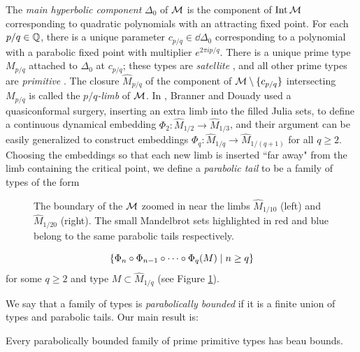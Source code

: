 \documentclass[12pt]{amsart}
\begin{document}
\renewcommand{\Card}{\dd \HC_0}
\newcommand{\HC}{\Delta}
{The \emph{main hyperbolic component} $\HC_0$ %
of $\mathcal M$ 
is the component of $\operatorname{Int} \mathcal M$
corresponding to quadratic polynomials with an attracting fixed point. 
For each $p/q\in \mathbb Q$, there is a unique parameter $c_{p/q}\in \Card$  corresponding to a polynomial with a parabolic fixed point with multiplier $e^{2\pi i p/q}$.}
There is a unique prime type $M_{p/q}$ attached to $\HC_0$ at $c_{p/q}$; these types are \emph{{satellite}} , and all other prime types are \emph{{primitive}} .
The {closure} $\hat M_{p/q}$  of the component  of $\mathcal M\setminus \{c_{p/q}\}$ intersecting $M_{p/q}$ is called the \textit{$p/q$-limb} of $\mathcal M$.
In \cite{BD86}, 
Branner and Douady used a quasiconformal surgery,  inserting an extra limb into the filled Julia sets,  to define a continuous dynamical embedding $\Phi_2: \hat{M}_{1/2}\to \hat{M}_{1/3}$, and their argument can be easily generalized to construct embeddings $\Phi_{q}: \hat{M}_{1/q}\to \hat{M}_{1/{(q+1)}}$ for all $q\geq 2$.
Choosing the embeddings so that each new limb is inserted ``far away" from the limb containing the critical point, we define a \textit{parabolic tail}  to be a family of types of the form 
\begin{figure}
	\begin{center}
		\def\svgwidth{5.5in}
		
		\caption{The boundary of the $\mathcal M$ zoomed in near the limbs $\hat{M}_{1/10}$ (left) and $\hat{M}_{1/20}$ (right). The small Mandelbrot sets 
         highlighted in red and blue belong to the same parabolic tails respectively.}
		\label{fig:parabolic tails}
	\end{center}
\end{figure}
$$\left\{ \Phi_{n}\circ \Phi_{n-1}\circ \dots \circ \Phi_{q}(M) \mid n\geq q \right\}$$
for some $q\geq 2$ and type $M\subset \hat{M}_{1/q}$ (see Figure \ref{fig:parabolic tails}). 


We say that a family of types is \textit{parabolically bounded}  if 
it is a finite union of types and  parabolic tails. Our main result is:




\begin{thmA}\label{thm: A}
	Every parabolically bounded family of prime primitive types has beau bounds. 
\end{thmA}
\end{document}
